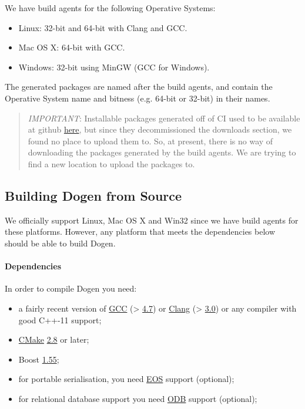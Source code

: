 \documentclass{book}
\begin{document}
We have build agents for the following Operative Systems:

\begin{itemize}
\item Linux: 32-bit and 64-bit with Clang and GCC.
\item Mac OS X: 64-bit with GCC.
\item Windows: 32-bit using MinGW (GCC for Windows).
\end{itemize}

The generated packages are named after the build agents, and contain
the Operative System name and bitness (e.g. 64-bit or 32-bit) in their
names.

\begin{quote}
\emph{IMPORTANT}: Installable packages generated off of CI used to be
available at github
\href{https://github.com/DomainDrivenConsulting/dogen/downloads}{here},
but since they decommissioned the downloads section, we found no place
to upload them to. So, at present, there is no way of downloading the
packages generated by the build agents. We are trying to find a new
location to upload the packages to.
\end{quote}

\subsection{Building Dogen from Source}

We officially support Linux, Mac OS X and Win32 since we have build
agents for these platforms. However, any platform that meets the
dependencies below should be able to build Dogen.

\paragraph{Dependencies}

In order to compile Dogen you need:

\begin{itemize}
\item a fairly recent version of \href{http://gcc.gnu.org/}{GCC} (>
  \href{http://gcc.gnu.org/gcc-4.7/}{4.7}) or
  \href{http://clang.llvm.org/index.html}{Clang} (>
  \href{http://llvm.org/releases/3.0/docs/ClangReleaseNotes.html}{3.0})
  or any compiler with good C++-11 support;
\item \href{http://www.cmake.org/}{CMake}
  \href{http://www.kitware.com/news/home/browse/CMake?2013_05_22&CMake\%2B2.8.11\%2BNow\%2BAvailable}{2.8}
  or later;
\item Boost
  \href{http://www.boost.org/users/history/version_1_55_0.html}{1.55};
\item for portable serialisation, you need
  \href{http://epa.codeplex.com/}{EOS} support (optional);
\item for relational database support you need
  \href{http://www.codesynthesis.com/products/odb/}{ODB} support
  (optional);
\end{itemize}
\end{document}
